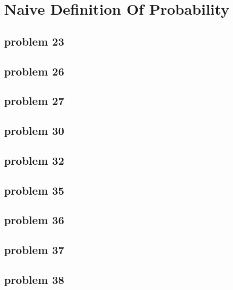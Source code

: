 \section{Naive Definition Of Probability}

\subsection{problem 23}


\subsection{problem 26}


\subsection{problem 27}


\subsection{problem 30}


\subsection{problem 32}


\subsection{problem 35}


\subsection{problem 36}


\subsection{problem 37}


\subsection{problem 38}
